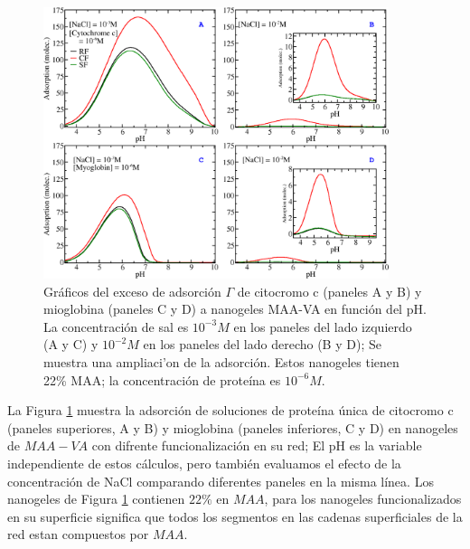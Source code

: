 \begin{figure}[!htb]
\includegraphics[width=0.9\textwidth]{Figures/graphs-gel2/abcd.png}
\caption{Gr\'aficos del exceso de adsorci\'on $\Gamma$ de citocromo c (paneles A y B) y mioglobina (paneles C y D) a nanogeles MAA-VA en funci\'on del pH.
	La concentraci\'on de sal es $10^{-3}M$ en los paneles del lado izquierdo (A y C) y $10^{-2}M$ en los paneles del lado derecho
	(B y D); Se muestra una ampliaci'on de la adsorci\'on.
	Estos nanogeles tienen 22\% MAA; la concentraci\'on de prote\'ina es $10^{-6}M$.}
\label{fig:esf:adsorption-vs-pH-cyto-myo}
\end{figure}



 
 La Figura \ref{fig:esf:adsorption-vs-pH-cyto-myo} muestra la adsorci\'on de soluciones de prote\'ina \'unica de citocromo c (paneles superiores, A y B) y mioglobina (paneles inferiores, C y D) en nanogeles de $MAA-VA$ con difrente funcionalizaci\'on en su red;
 El pH es la variable independiente de estos c\'alculos, pero tambi\'en evaluamos el efecto de la concentraci\'on de NaCl comparando diferentes paneles en la misma l\'inea.
 Los nanogeles de Figura \ref{fig:esf:adsorption-vs-pH-cyto-myo} contienen $22\%$ en $MAA$, para los nanogeles funcionalizados en su superficie significa que todos los segmentos en las cadenas superficiales de la red estan compuestos por $MAA$.
  
